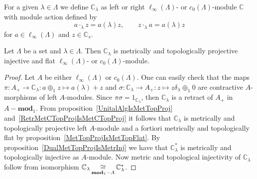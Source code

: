 For a given $\lambda\in\Lambda$ we define $\mathbb{C}_\lambda$ as left or right
$\ell_\infty(\Lambda)$- or $c_0(\Lambda)$-module $\mathbb{C}$ with module action
defined by
$$
a\cdot_\lambda z=a(\lambda)z,\qquad z\cdot_\lambda a=a(\lambda) z
$$
for $a\in \ell_\infty(\Lambda)$ and $z\in\mathbb{C}_s$. 

\begin{proposition}\label{OneDimlInftyc0ModMetTopProjIngFlat} Let $\Lambda$ be a
set and $\lambda\in\Lambda$. Then $\mathbb{C}_\lambda$ is metrically and
topologically projective injective and flat $\ell_\infty(\Lambda)$- or
$c_0(\Lambda)$-module.
\end{proposition}
\begin{proof} Let $A$ be either $\ell_\infty(\Lambda)$ or $c_0(\Lambda)$. One
can easily check that the 
maps $\pi:A_+\to\mathbb{C}_\lambda:a\oplus_1 z\mapsto a(\lambda)+z$ 
and $\sigma:\mathbb{C}_\lambda\to A_+:z\mapsto z\delta_\lambda\oplus_1 0$ 
are contractive $A$-morphisms of left $A$-modules.
Since $\pi\sigma=1_{\mathbb{C}_\lambda}$, then $\mathbb{C}_\lambda$ is a retract
of $A_+$ in $A-\mathbf{mod}_1$. From proposition~\ref{UnitalAlgIsMetTopProj}
and~\ref{RetrMetCTopProjIsMetCTopProj} it follows that $\mathbb{C}_\lambda$ is
metrically and topologically projective left $A$-module and a fortiori
metrically and topologically flat by proposition~\ref{MetTopProjIsMetTopFlat}.
By proposition~\ref{DualMetTopProjIsMetrInj} we have that $\mathbb{C}_\lambda^*$
is metrically and topologically injective as $A$-module. Now metric and
topological injectivity of $\mathbb{C}_\lambda$ follow from isomorphism
$\mathbb{C}_\lambda\mathop{\mathbin{\cong}}\limits_{\mathbf{mod}_1-A}\mathbb{C}_\lambda^*$.
\end{proof}

